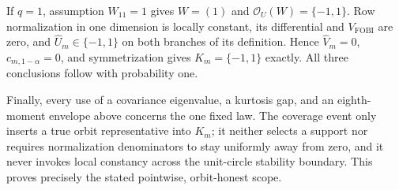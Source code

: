If \(q=1\), assumption \(W_{11}=1\) gives \(W=(1)\) and \(\mathcal O_U(W)=\{-1,1\}\). Row normalization in one dimension is locally constant, its differential and \(V_{\mathrm{FOBI}}\) are zero, and \(\widehat U_m\in\{-1,1\}\) on both branches of its definition. Hence \(\widehat V_m=0\), \(c_{m,1-\alpha}=0\), and symmetrization gives \(K_m=\{-1,1\}\) exactly. All three conclusions follow with probability one.

Finally, every use of a covariance eigenvalue, a kurtosis gap, and an eighth-moment envelope above concerns the one fixed law. The coverage event only inserts a true orbit representative into \(K_m\); it neither selects a support nor requires normalization denominators to stay uniformly away from zero, and it never invokes local constancy across the unit-circle stability boundary. This proves precisely the stated pointwise, orbit-honest scope.
